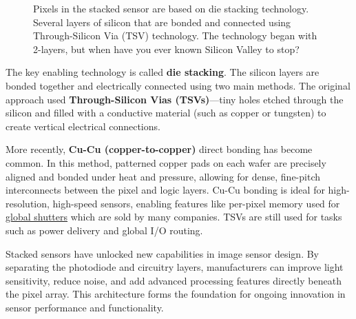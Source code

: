 \documentclass[
  letterpaper,
]{book}
\begin{document}
\begin{figure}


\caption{\label{fig-sensor-stacked}Pixels in the stacked sensor are
based on die stacking technology. Several layers of silicon that are
bonded and connected using Through-Silicon Via (TSV) technology. The
technology began with 2-layers, but when have you ever known Silicon
Valley to stop?}

\end{figure}%

The key enabling technology is called \textbf{die stacking}. The silicon
layers are bonded together and electrically connected using two main
methods. The original approach used \textbf{Through-Silicon Vias
(TSVs)}---tiny holes etched through the silicon and filled with a
conductive material (such as copper or tungsten) to create vertical
electrical connections.

More recently, \textbf{Cu-Cu (copper-to-copper)} direct bonding has
become common. In this method, patterned copper pads on each wafer are
precisely aligned and bonded under heat and pressure, allowing for
dense, fine-pitch interconnects between the pixel and logic layers.
Cu-Cu bonding is ideal for high-resolution, high-speed sensors, enabling
features like per-pixel memory used for
\hyperref[def-global-shutter]{global shutters} which are sold by many
companies. TSVs are still used for tasks such as power delivery and
global I/O routing.

Stacked sensors have unlocked new capabilities in image sensor design.
By separating the photodiode and circuitry layers, manufacturers can
improve light sensitivity, reduce noise, and add advanced processing
features directly beneath the pixel array. This architecture forms the
foundation for ongoing innovation in sensor performance and
functionality.
\end{document}
